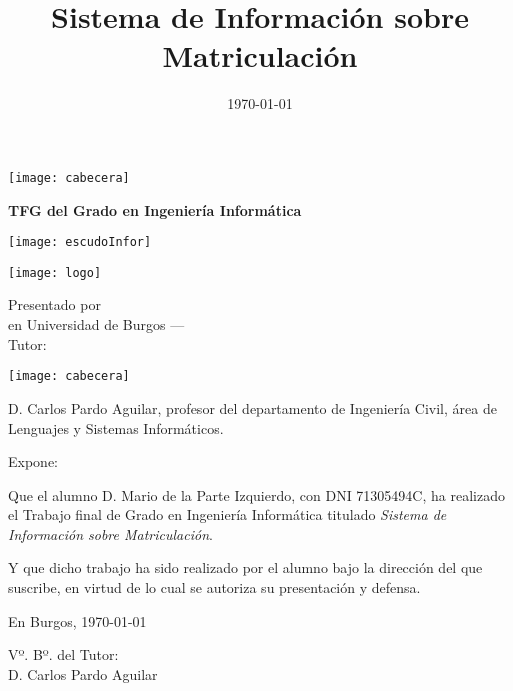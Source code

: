 \documentclass[a4paper,12pt,twoside]{memoir}
\title{Sistema de Información sobre Matriculación}
\author{\nombre}
\date{\today}
\makeatletter
\def\maketitle{
  \null
  \thispagestyle{empty}
\noindent\texttt{[image: cabecera]}\vspace{1cm}%
  \vfill
  \colorbox{cpardoBox}{%
    \begin{minipage}{.8\textwidth}
      \vspace{.5cm}\Large
      \begin{center}
      \textbf{TFG del Grado en Ingeniería Informática}\vspace{.6cm}\\
      \textbf{\LARGE\@title{}}
      \end{center}
      \vspace{.2cm}
    \end{minipage}

  }%
  \hfill\begin{minipage}{.20\textwidth}
    \texttt{[image: escudoInfor]}
   
  \end{minipage}
  \vfill
  \begin{center}
   \texttt{[image: logo]}
   \end{center}
  \begin{center}%
  {%
    \noindent\LARGE
    Presentado por \@author{}\\ 
    en Universidad de Burgos --- \@date{}\\
    Tutor: \@tutor{}\\
  }%
  \end{center}%
  \null
  \cleardoublepage
  }
\newcommand{\nombre}{Mario de la Parte Izquierdo} %
\makeatother
\begin{document}
\maketitle


\newpage\null\thispagestyle{empty}


\thispagestyle{empty}


\noindent\texttt{[image: cabecera]}\vspace{1cm}

\noindent D. Carlos Pardo Aguilar, profesor del departamento de Ingeniería Civil, área de Lenguajes y Sistemas Informáticos.

\noindent Expone:

\noindent Que el alumno D. \nombre, con DNI 71305494C, ha realizado el Trabajo final de Grado en Ingeniería Informática titulado \emph{Sistema de Información sobre Matriculación}. 

\noindent Y que dicho trabajo ha sido realizado por el alumno bajo la dirección del que suscribe, en virtud de lo cual se autoriza su presentación y defensa.

\begin{center} %
En Burgos, {\large \today}
\end{center}

\vfill\vfill\vfill




\begin{minipage}{0.45\textwidth}
\begin{flushleft} %
Vº. Bº. del Tutor:\\[2cm]
D. Carlos Pardo Aguilar
\end{flushleft}
\end{minipage}
\hfill
\end{document}
